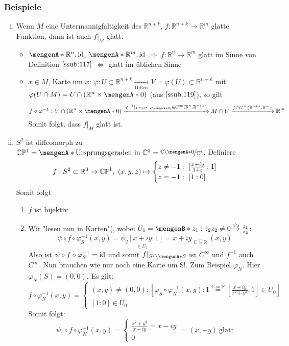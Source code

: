 \subsubsection{Beispiele}
\label{ssub:120}
\begin{enumerate}[(i)]
\item Wenn $M$ eine Untermannigfaltigkeit des $\mathds{R}^{n+k}$, $f:\mathds{R}^{n+k}\to \mathds{R}^m$ glatte Funktion, dann ist auch $f\vert_M$ glatt.
\begin{itemize}
\item $\set{\mathds{R}^n,\id}$, $\set{\mathds{R}^m,\id}$ $\Rightarrow\ f:\mathds{R}^n\to \mathds{R}^m$ glatt im Sinne von Definition $\ref{ssub:117}$ $\Leftrightarrow$ glatt im üblichen Sinne
\item $x\in M$, Karte um $x$: $\varphi: U\subset \mathds{R}^{n+k} \underset{\text{Diffeo.}}{\to} V = \varphi(U)\subset \mathds{R}^{n+k}$ mit $\varphi(U\cap M) = U\cap (\mathds{R}^n\times \set{0})$ (aus $\ref{ssub:119}$), so gilt
\[
f\circ \varphi^{-1}: V\cap (\mathds{R}^n\times \set{0}) \xrightarrow{\varphi^{-1} \vert_{V\cap (\mathds{R}^n\times \set{0})}\in C^{\infty}(\mathds{R}^n,\mathds{R}^{n+k})} 
M\cap U \xrightarrow{f \in C^{\infty}(\mathds{R}^{n+k},\mathds{R}^m)} \mathds{R}^m
\]
Somit folgt, dass $f\vert_M$ glatt ist. 
\end{itemize}
\item $S^2$ ist diffeomorph zu $\mathds{C}\mathds{P}^1 = \set{\text{Ursprungsgeraden in}\ \mathds{C}^2} = \nicefrac{\mathds{C}\backslash \set{0}}{\mathds{C}^*}$. Definiere 
\[
f: S^2\subset \mathbb{R}^3 \to \mathbb{C}\mathbb{P}^1,\ (x,y,z) \mapsto
\begin{cases}
z\neq -1:\ [\frac{x+iy}{1+z}:1]\\
z = -1:\ [1:0]
\end{cases}
\]
Somit folgt
\begin{enumerate}[(1)]
\item $f$ ist bijektiv
\item Wir "lesen nun in Karten"(, wobei $U_1 = \set[ z_1:z_2 ]{z_2\neq 0} \overset{\psi_2}{\to} \frac{z_1}{z_2}$:
\[
\psi \circ f \circ \varphi_S^{-1}(x,y) = \underset{\in U_1}{\psi_2 [x+iy:1]} = x + iy \underset{\mathds{C} \simeq \mathds{R}}{=} (x,y)
\]
Also ist $\psi \circ f \circ \varphi_S^{-1} = \operatorname{id}$ und somit $f \vert_{S^2\backslash\set{S}}$ ist $C^{\infty}$ und $f^{-1}$ auch $C^{\infty}$. Nun brauchen wie nur noch eine Karte um S!. Zum Beispiel $\varphi_N$. Hier $\varphi_N(S) = (0,0)$. Es gilt:
\[
	f\circ \varphi_N^{-1}(x,y) = 
	\begin{cases}
		(x,y) \neq (0,0): [\varphi_S \circ \varphi_N^{-1}(x,y):1 \overset{\mathds{C} \simeq \mathds{R}}{=} [\frac{x+iy}{x^2+y^2}:1] \in U_0]\\
	[1:0] \in U_0 
	\end{cases}
\]
Somit folgt:
\[
	\psi_1 \circ f \circ \varphi_N^{-1}(x,y) =
	\begin{cases}
		\frac{x^2+y^2}{x+iy} = x-iy\\
		0
	\end{cases}
	= (x,-y)\ \text{glatt}
\]
\end{enumerate}
\end{enumerate}

